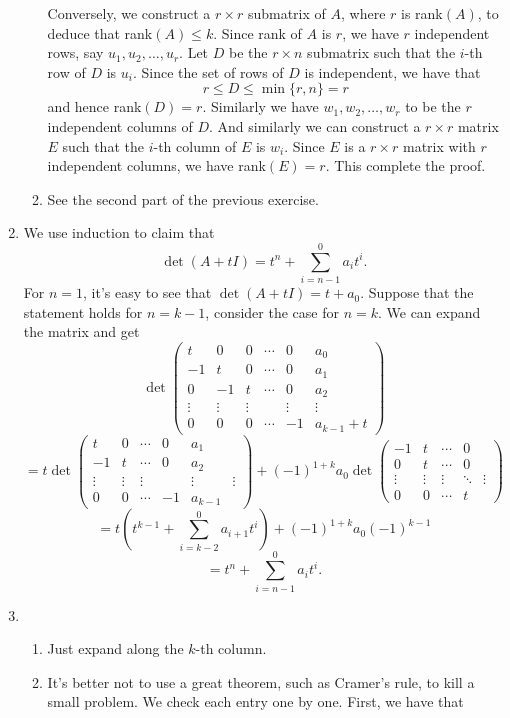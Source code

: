\begin{enumerate}
\begin{enumerate}
Conversely, we construct a $r\times r$ submatrix of $A$, where $r$ is rank$(A)$, to deduce that rank$(A)\leq k$. Since rank of $A$ is $r$, we have $r$ independent rows, say $u_1,u_2,\ldots ,u_r$. Let $D$ be the $r\times n$ submatrix such that the $i$-th row of $D$ is $u_i$. Since the set of rows of $D$ is independent, we have that 
\[r\leq D \leq \min\{r,n\}=r\]
and hence rank$(D)=r$. Similarly we have $w_1,w_2,\ldots ,w_r$ to be the $r$ independent columns of $D$. And similarly we can construct a $r\times r$ matrix $E$ such that the $i$-th column of $E$ is $w_i$. Since $E$ is a $r\times r$ matrix with $r$ independent columns, we have rank$(E)=r$. This complete the proof.
\item See the second part of the previous exercise.
\end{enumerate}
\item We use induction to claim that 
\[\det(A+tI)=t^n+\sum_{i=n-1}^{0}{a_it^i}.\]
For $n=1$, it's easy to see that $\det(A+tI)=t+a_0$. Suppose that the statement holds for $n=k-1$, consider the case for $n=k$. We can expand the matrix and get 
\[\det\begin{pmatrix}t&0&0&\cdots &0&a_0\\-1&t&0&\cdots &0&a_1\\0&-1&t&\cdots &0&a_2\\\vdots &\vdots &\vdots & &\vdots &\vdots \\0&0&0&\cdots &-1&a_{k-1}+t\end{pmatrix} \]
\[=t\det\begin{pmatrix}t&0&\cdots &0&a_1\\-1&t&\cdots &0&a_2\\\vdots &\vdots &\vdots & &\vdots &\vdots \\0&0&\cdots &-1&a_{k-1}\end{pmatrix}+(-1)^{1+k}a_0\det\begin{pmatrix}-1&t&\cdots &0\\0&t&\cdots &0\\\vdots &\vdots &\vdots &\ddots &\vdots \\0&0&\cdots &t\end{pmatrix}\]
\[=t(t^{k-1}+\sum_{i=k-2}^{0}{a_{i+1}t^i})+(-1)^{1+k}a_0(-1)^{k-1}\]
\[=t^n+\sum_{i=n-1}^{0}{a_it^i}.\]
\item \begin{enumerate}
\item Just expand along the $k$-th column.
\item It's better not to use a great theorem, such as Cramer's rule, to kill a small problem. We check each entry one by one. First, we have that 

\end{enumerate}
\end{enumerate}
